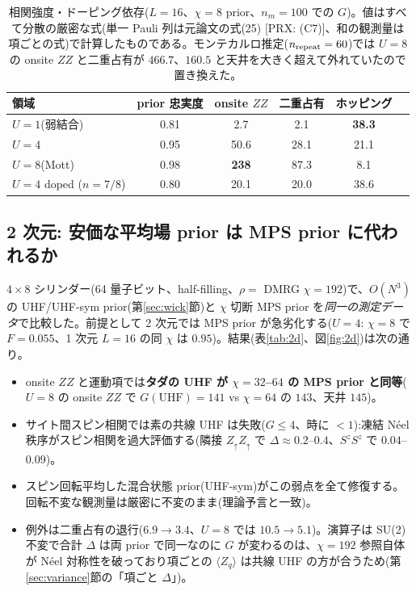 \documentclass[11pt,a4paper]{ltjsarticle}
\newcommand{\ev}[1]{\langle #1\rangle}
\begin{document}
\begin{table}[t]
\centering\small
\caption{相関強度・ドーピング依存($L=16$、$\chi{=}8$ prior、$n_m=100$ での $G$)。値はすべて分散の厳密な式(単一 Pauli 列は元論文の式(25) [PRX: (C7)]、和の観測量は項ごとの式)で計算したものである。モンテカルロ推定($n_{\rm repeat}=60$)では $U=8$ の onsite $ZZ$ と二重占有が $466.7$、$160.5$ と天井を大きく超えて外れていたので置き換えた。}
\label{tab:phasedep}
\begin{tabular}{@{}lccccc@{}}
\toprule
領域 & prior 忠実度 & onsite $ZZ$ & 二重占有 & ホッピング \\
\midrule
$U=1$(弱結合) & 0.81 & 2.7 & 2.1 & \textbf{38.3} \\
$U=4$ & 0.95 & 50.6 & 28.1 & 21.1 \\
$U=8$(Mott) & 0.98 & \textbf{238} & 87.3 & 8.1 \\
$U=4$ doped ($n{=}7/8$) & 0.80 & 20.1 & 20.0 & 38.6 \\
\bottomrule
\end{tabular}
\end{table}

\subsection{2 次元: 安価な平均場 prior は MPS prior に代われるか}
\label{sec:2d}
$4\times8$ シリンダー(64 量子ビット、half-filling、$\rho=$ DMRG $\chi=192$)で、$O(N^3)$ の UHF/UHF-sym prior(第\ref{sec:wick}節)と $\chi$ 切断 MPS prior を\emph{同一の測定データ}で比較した。前提として 2 次元では MPS prior が急劣化する($U=4$: $\chi{=}8$ で $F=0.055$、1 次元 $L=16$ の同 $\chi$ は $0.95$)。結果(表\ref{tab:2d}、図\ref{fig:2d})は次の通り。
\begin{itemize}
  \item onsite $ZZ$ と運動項では\textbf{タダの UHF が $\chi=32$--$64$ の MPS prior と同等}($U=8$ の onsite $ZZ$ で $G(\text{UHF})=141$ vs $\chi{=}64$ の $143$、天井 $145$)。
  \item サイト間スピン相関では素の共線 UHF は失敗($G\le4$、時に $<1$):凍結 Néel 秩序がスピン相関を過大評価する(隣接 $Z_\uparrow Z_\uparrow$ で $\Delta\approx0.2$--$0.4$、$S^zS^z$ で $0.04$--$0.09$)。
  \item スピン回転平均した混合状態 prior(UHF-sym)がこの弱点を全て修復する。回転不変な観測量は厳密に不変のまま(理論予言と一致)。
  \item 例外は二重占有の退行($6.9\to3.4$、$U=8$ では $10.5\to5.1$)。演算子は SU(2) 不変で合計 $\Delta$ は両 prior で同一なのに $G$ が変わるのは、$\chi=192$ 参照自体が Néel 対称性を破っており項ごとの $\ev{Z_q}$ は共線 UHF の方が合うため(第\ref{sec:variance}節の「項ごと $\Delta$」)。
\end{itemize}
\end{document}
